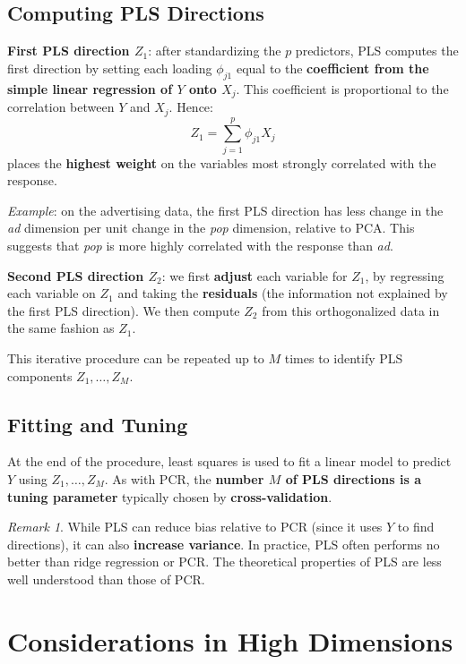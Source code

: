 \documentclass[11pt,a4paper]{article}
\theoremstyle{definition}
\theoremstyle{plain}
\theoremstyle{remark}
\newtheorem*{remark}{Remark}
\begin{document}
\subsection{Computing PLS Directions}

\textbf{First PLS direction $Z_1$}: after standardizing the $p$ predictors, PLS computes the first direction by setting each loading $\phi_{j1}$ equal to the \textbf{coefficient from the simple linear regression of $Y$ onto $X_j$}. This coefficient is proportional to the correlation between $Y$ and $X_j$. Hence:
\[
    Z_1 = \sum_{j=1}^{p} \phi_{j1} X_j
\]
places the \textbf{highest weight} on the variables most strongly correlated with the response.

\textit{Example}: on the advertising data, the first PLS direction has less change in the \textit{ad} dimension per unit change in the \textit{pop} dimension, relative to PCA. This suggests that \textit{pop} is more highly correlated with the response than \textit{ad}.

\textbf{Second PLS direction $Z_2$}: we first \textbf{adjust} each variable for $Z_1$, by regressing each variable on $Z_1$ and taking the \textbf{residuals} (the information not explained by the first PLS direction). We then compute $Z_2$ from this orthogonalized data in the same fashion as $Z_1$.

This iterative procedure can be repeated up to $M$ times to identify PLS components $Z_1, \ldots, Z_M$.

\subsection{Fitting and Tuning}

At the end of the procedure, least squares is used to fit a linear model to predict $Y$ using $Z_1, \ldots, Z_M$. As with PCR, the \textbf{number $M$ of PLS directions is a tuning parameter} typically chosen by \textbf{cross-validation}.

\begin{remark}
While PLS can reduce bias relative to PCR (since it uses $Y$ to find directions), it can also \textbf{increase variance}. In practice, PLS often performs no better than ridge regression or PCR. The theoretical properties of PLS are less well understood than those of PCR.
\end{remark}

\section{Considerations in High Dimensions}
\end{document}
